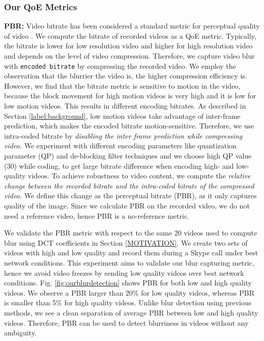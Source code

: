 \subsubsection{Our QoE Metrics}

\noindent \noindent \textbf{PBR:} 
Video bitrate has been considered a standard metric for perceptual quality of video \cite{zhang2012profiling, chakraborty2016exbox}.
We compute the bitrate of recorded videos as a QoE metric. Typically, the bitrate is lower for low resolution video and higher for high resolution video and depends on the level of video compression.
Therefore, we capture video blur with \texttt{encoded bitrate} by compressing the recorded video. 
We employ the observation that the blurrier the video is, the higher compression efficiency is. 
However, we find that the bitrate metric is sensitive to motion in the video, because the block movement for high motion videos is very high and it is low for low motion videos. This results in different encoding bitrates. 
As described in Section \ref{label:background}, low motion videos take advantage of inter-frame prediction, which makes the encoded bitrate motion-sensitive. 
Therefore, we use intra-coded bitrate by \emph{disabling the inter frame prediction while compressing video.}
We experiment with different encoding parameters like quantization parameter (QP) and de-blocking filter techniques and we choose high QP value (30) while coding, to get large bitrate difference when encoding high- and low-quality videos. 
To achieve robustness to video content, we compute the \emph{relative change between the recorded bitrate and  the intra-coded bitrate of the compressed video.} We define this change as the perceptual bitrate (PBR), as it only captures quality of the image. Since we calculate PBR on the recorded video, we do not need a reference video, hence PBR is a no-reference metric.

We validate the PBR metric with respect to the same 20 videos used to compute blur using DCT coefficients in Section \ref{MOTIVATION}.
We create two sets of videos with high and low quality and record them during a Skype call under best network conditions.
This experiment aims to validate our blur capturing metric, hence we avoid video freezes by sending low quality videos over best network conditions.
Fig. \ref{fig:ourblurdetection} shows PBR for both low and high quality videos.
We observe a PBR larger than 20\% for low quality videos, whereas PBR is smaller than 5\%  for high quality videos.
Unlike blur detection using previous methods, we see a clean separation of average PBR between low and high quality videos. Therefore, PBR can be used to detect blurriness in videos without any ambiguity.

